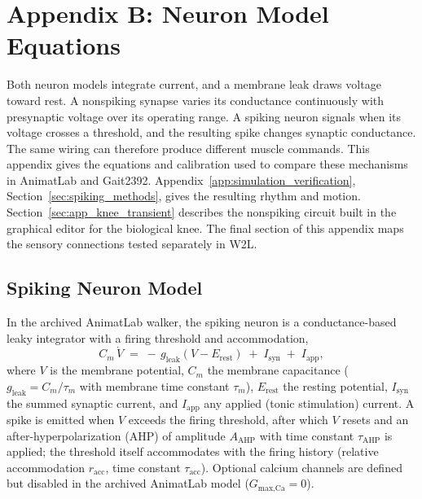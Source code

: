 \chapter{Appendix B: Neuron Model Equations}\label{app:neuron_equations}
\graphicspath{{../Figures/93-AppendixB/}{figs/93-AppendixB/}}

Both neuron models integrate current, and a membrane leak draws voltage toward rest. A nonspiking synapse varies its conductance continuously with presynaptic voltage over its operating range. A spiking neuron signals when its voltage crosses a threshold, and the resulting spike changes synaptic conductance. The same wiring can therefore produce different muscle commands. This appendix gives the equations and calibration used to compare these mechanisms in AnimatLab and Gait2392. Appendix~\ref{app:simulation_verification}, Section~\ref{sec:spiking_methods}, gives the resulting rhythm and motion. Section~\ref{sec:app_knee_transient} describes the nonspiking circuit built in the graphical editor for the biological knee. The final section of this appendix maps the sensory connections tested separately in W2L.

\section{Spiking Neuron Model}

In the archived AnimatLab walker, the spiking neuron is a conductance-based leaky integrator with a firing threshold and accommodation,
\begin{equation}
    C_{m}\,\dot{V} \;=\; -\,g_{\text{leak}}\left(V - E_{\text{rest}}\right)
                      \;+\; I_{\text{syn}} \;+\; I_{\text{app}},
    \label{eq:app_membrane}
\end{equation}
where $V$ is the membrane potential, $C_{m}$ the membrane capacitance ($g_{\text{leak}} = C_{m}/\tau_{m}$ with membrane time constant $\tau_{m}$), $E_{\text{rest}}$ the resting potential, $I_{\text{syn}}$ the summed synaptic current, and $I_{\text{app}}$ any applied (tonic stimulation) current. A spike is emitted when $V$ exceeds the firing threshold, after which $V$ resets and an after-hyperpolarization (AHP) of amplitude $A_{\text{AHP}}$ with time constant $\tau_{\text{AHP}}$ is applied; the threshold itself accommodates with the firing history (relative accommodation $r_{\text{acc}}$, time constant $\tau_{\text{acc}}$). Optional calcium channels are defined but disabled in the archived AnimatLab model ($G_{\text{max,Ca}} = 0$).

